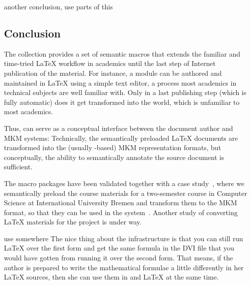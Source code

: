 \begin{oldpart}{another conclusion, use parts of this}
\subsection{Conclusion}\label{sec:concl}

The {\stex} collection provides a set of semantic macros that extends the familiar and
time-tried {\LaTeX} workflow in academics until the last step of Internet publication of
the material. For instance, a {\connexions} module can be authored and maintained in
{\LaTeX} using a simple text editor, a process most academics in technical subjects are
well familiar with. Only in a last publishing step (which is fully automatic) does it get
transformed into the {\xml} world, which is unfamiliar to most academics. 

Thus, {\stex} can serve as a conceptual interface between the document author and MKM
systems: Technically, the semantically preloaded {\LaTeX} documents are transformed into
the (usually {\xml}-based) MKM representation formats, but conceptually, the ability to
semantically annotate the source document is sufficient.

 
The {\stex} macro packages have been validated together with a case
study~\cite{Kohlhase:smtl05}, where we semantically preload the course materials for a
two-semester course in Computer Science at International University Bremen and transform
them to the {\omdoc} MKM format, so that they can be used in the {\activemath}
system~\cite{activemathAIEDJ01}. Another study of converting {\LaTeX} materials for the
{\connexions} project is under way.
\end{oldpart}

\begin{oldpart}{use somewhere}
  The nice thing about the infrastructure is that you can still run {\LaTeX} over the
  first form and get the same formula in the DVI file that you would have gotten from
  running it over the second form. That means, if the author is prepared to write the
  mathematical formulae a little differently in her {\LaTeX} sources, then she can use
  them in {\xml} and {\LaTeX} at the same time.
\end{oldpart}

